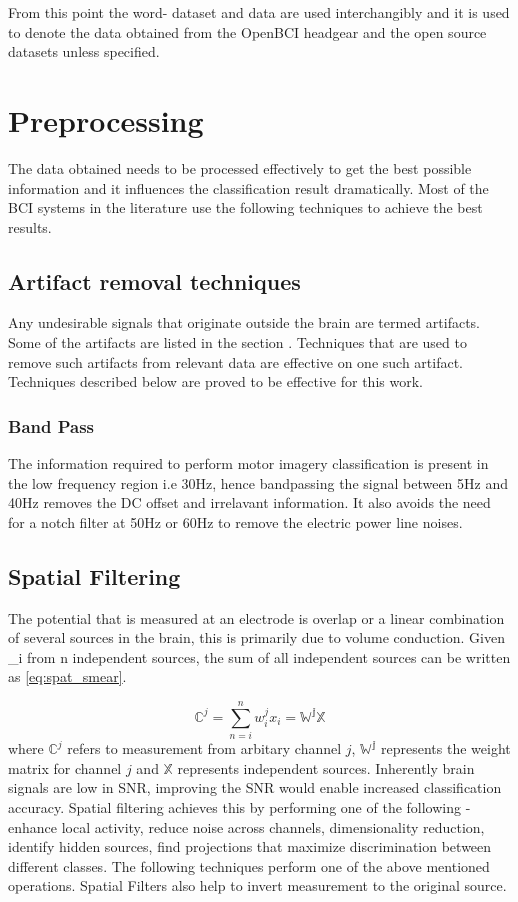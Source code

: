 From this point the word- dataset and data are used interchangibly and it is used to denote the data obtained from the OpenBCI headgear and the open source datasets unless specified.

\section{Preprocessing}
The data obtained needs to be processed effectively to get the best possible information and it influences the classification result dramatically. Most of the BCI systems in the
literature use the following techniques to achieve the best results. 

\subsection{Artifact removal techniques}
    Any undesirable signals that originate outside the brain  are termed artifacts. Some of the artifacts are listed in the section \sec. Techniques that are used to remove such
artifacts from relevant data are effective on one such artifact. Techniques described below are proved to be effective for this work. 

\subsubsection{Band Pass}
The information required to perform motor imagery classification is present in the low frequency region i.e 30Hz, hence bandpassing the signal between 5Hz and 40Hz removes the DC 
offset and irrelavant information. It also avoids the need for a notch filter at 50Hz or 60Hz to remove the electric power line noises. 

\subsection{Spatial Filtering}
The potential that is measured at an electrode is overlap or a linear combination of several sources in the brain, this is primarily due to volume conduction. Given _i
from n independent sources, the sum of all independent sources can be written as \ref{eq:spat_smear}.

\begin{equation} \label{eq:spat_smear}
    \mathbb{C}^{j} = \sum_{n = i}^{n} w_{i}^{j} x_{i} = \mathbb{W^{j} X} 
\end{equation}
where $\mathbb{C}^{j} $ refers to measurement from arbitary channel $j$,  $\mathbb{W^j}$ represents the weight matrix for channel $j$ and $\mathbb{X}$ represents independent sources.
Inherently brain signals are low in SNR, improving the SNR would enable increased classification accuracy. Spatial filtering achieves this by performing one of the following 
- enhance local activity, reduce noise across channels, dimensionality reduction, identify hidden sources, find projections that maximize
discrimination between different classes. The following techniques perform one of the above mentioned operations. Spatial Filters also help to invert measurement to the
original source.

